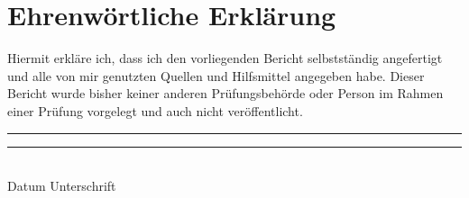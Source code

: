 \chapter*{Ehrenwörtliche Erklärung}

Hiermit erkläre ich, dass ich den vorliegenden Bericht selbstständig 
angefertigt und alle von mir genutzten Quellen und Hilfsmittel angegeben 
habe. Dieser Bericht wurde bisher keiner anderen Prüfungsbehörde oder 
Person im Rahmen einer Prüfung vorgelegt und auch nicht veröffentlicht.

\vspace{5cm}

\rule{3.5cm}{1pt} \hspace{1.5cm} \rule{10cm}{1pt}\\
Datum \hspace{4cm} Unterschrift\\